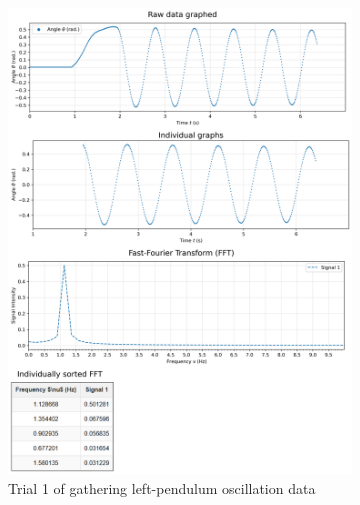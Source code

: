 \documentclass[12pt]{article}
\begin{document}
\begin{figure}[H]
    \centering
    \begin{subfigure}{0.49\linewidth}
        \centering
        \includegraphics[width=0.98\linewidth]{figs/left pendulum trial 1.png}
        \caption{Trial 1 of gathering left-pendulum oscillation data}
    \end{subfigure}
    \begin{subfigure}{0.49\linewidth}
        \centering

\end{subfigure}
\end{figure}
\end{document}
